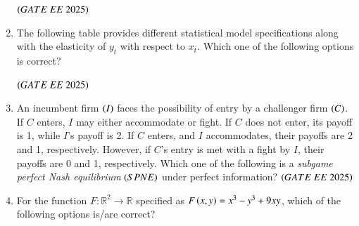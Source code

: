 \documentclass[journal,12pt,onecolumn]{IEEEtran}
\theoremstyle{remark}
\begin{document}
\begin{enumerate}
\hfill $\brak{GATE\ EE\ 2025}$
\begin{enumerate}
\end{enumerate}
\item The following table provides different statistical model specifications along with the elasticity of $y_t$ with respect to $x_t$. Which one of the following options is correct?
\begin{center}

\end{center}
\hfill $\brak{GATE\ EE\ 2025}$
\begin{enumerate}
\end{enumerate}
\item An incumbent firm $\left(I\right)$ faces the possibility of entry by a challenger firm $\left(C\right)$. If $C$ enters, $I$ may either accommodate or fight. If $C$ does not enter, its payoff is 1, while $I$'s payoff is 2. If $C$ enters, and $I$ accommodates, their payoffs are 2 and 1, respectively. However, if $C$'s entry is met with a fight by $I$, their payoffs are 0 and 1, respectively. Which one of the following is a \textit{subgame perfect Nash equilibrium} $\left(SPNE\right)$ under perfect information?
\hfill $\brak{GATE\ EE\ 2025}$
\begin{enumerate}
\end{enumerate}
\item For the function $F: \mathbb{R}^2 \to \mathbb{R}$ specified as $F\left(x, y\right) = x^3 - y^3 + 9xy$, which of the following options is/are correct?

\end{enumerate}
\end{document}

